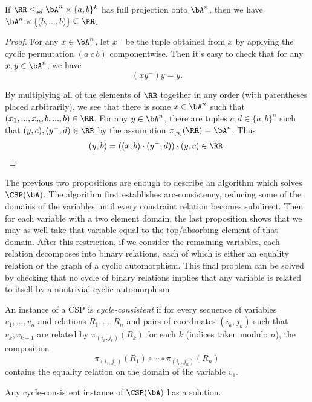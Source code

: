 \begin{prop}\label{rps-absorb} If $\RR \le_{sd} \bA^n\times \{a,b\}^k$ has full projection onto $\bA^n$, then we have $\bA^n\times \{(b,...,b)\} \subseteq \RR$.
\end{prop}
\begin{proof} For any $x \in \bA^n$, let $x^-$ be the tuple obtained from $x$ by applying the cyclic permutation $(a\ c\ b)$ componentwise. Then it's easy to check that for any $x,y \in \bA^n$, we have
\[
(xy^-)y = y.
\]

By multiplying all of the elements of $\RR$ together in any order (with parentheses placed arbitrarily), we see that there is some $x \in \bA^n$ such that $(x_1, ..., x_n, b, ..., b) \in \RR$. For any $y \in \bA^n$, there are tuples $c,d \in \{a,b\}^n$ such that $(y,c), (y^-,d) \in \RR$ by the assumption $\pi_{[n]}(\RR) = \bA^n$. Thus
\[
(y,b) = ((x,b)\cdot(y^{-},d))\cdot (y,c) \in \RR.\qedhere
\]
\end{proof}

The previous two propositions are enough to describe an algorithm which solves $\CSP(\bA)$. The algorithm first establishes arc-consistency, reducing some of the domains of the variables until every constraint relation becomes subdirect. Then for each variable with a two element domain, the last proposition shows that we may as well take that variable equal to the top/absorbing element of that domain. After this restriction, if we consider the remaining variables, each relation decomposes into binary relations, each of which is either an equality relation or the graph of a cyclic automorphism. This final problem can be solved by checking that no cycle of binary relations implies that any variable is related to itself by a nontrivial cyclic automorphism.

\begin{defn} An instance of a CSP is \emph{cycle-consistent} if for every sequence of variables $v_1, ..., v_n$ and relations $R_1, ..., R_n$ and pairs of coordinates $(i_k,j_k)$ such that $v_k, v_{k+1}$ are related by $\pi_{(i_k,j_k)}(R_k)$ for each $k$ (indices taken modulo $n$), the composition
\[
\pi_{(i_1,j_1)}(R_1) \circ \cdots \circ \pi_{(i_n,j_n)}(R_n)
\]
contains the equality relation on the domain of the variable $v_1$.
\end{defn}

\begin{cor} Any cycle-consistent instance of $\CSP(\bA)$ has a solution.
\end{cor}

